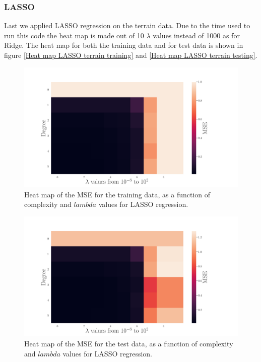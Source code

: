 \subsubsection{LASSO}
\noindent Last we applied LASSO regression on the terrain data. Due to the time used to run this code the heat map is made out of 10 $\lambda$ values instead of 1000 as for Ridge. The heat map for both the training data and for test data is shown in figure \eqref{Heat map LASSO terrain training} and \eqref{Heat map LASSO terrain testing}. 
\begin{figure}[H]
	\centering
	\includegraphics[width=\linewidth]{images/Figure_24.png}
	\caption{Heat map of the MSE for the training data, as a function of complexity and $lambda$ values for LASSO regression.}
	\label{Heat map LASSO terrain training}
\end{figure}
\begin{figure}[H]
	\centering
	\includegraphics[width=\linewidth]{images/Figure_25.png}
	\caption{Heat map of the MSE for the test data, as a function of complexity and $lambda$ values for LASSO regression.}
	\label{Heat map LASSO terrain testing}
\end{figure}
